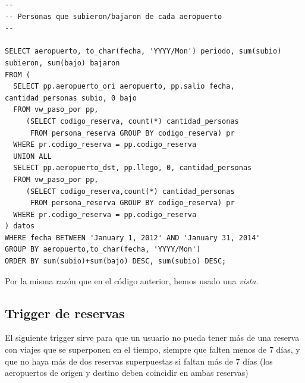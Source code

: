\documentclass[a4paper,10pt]{article}
\begin{document}
\begin{verbatim}
--
-- Personas que subieron/bajaron de cada aeropuerto
--

SELECT aeropuerto, to_char(fecha, 'YYYY/Mon') periodo, sum(subio) subieron, sum(bajo) bajaron 
FROM (
  SELECT pp.aeropuerto_ori aeropuerto, pp.salio fecha, cantidad_personas subio, 0 bajo
  FROM vw_paso_por pp,
     (SELECT codigo_reserva, count(*) cantidad_personas
      FROM persona_reserva GROUP BY codigo_reserva) pr
  WHERE pr.codigo_reserva = pp.codigo_reserva
  UNION ALL
  SELECT pp.aeropuerto_dst, pp.llego, 0, cantidad_personas
  FROM vw_paso_por pp,
     (SELECT codigo_reserva,count(*) cantidad_personas
      FROM persona_reserva GROUP BY codigo_reserva) pr
  WHERE pr.codigo_reserva = pp.codigo_reserva
) datos
WHERE fecha BETWEEN 'January 1, 2012' AND 'January 31, 2014'
GROUP BY aeropuerto,to_char(fecha, 'YYYY/Mon')
ORDER BY sum(subio)+sum(bajo) DESC, sum(subio) DESC;

\end{verbatim}

Por la misma razón que en el código anterior, hemos usado una \textit{vista}.


\subsection{Trigger de reservas}

El siguiente trigger sirve para que un usuario no pueda tener m\'as de una reserva con viajes que se superponen en el tiempo, siempre que falten menos de 7 d\'ias, y que no haya m\'as de dos reservas superpuestas si faltan m\'as de 7 d\'ias (los aeropuertos de origen y destino deben coincidir en ambas reservas)
\end{document}
